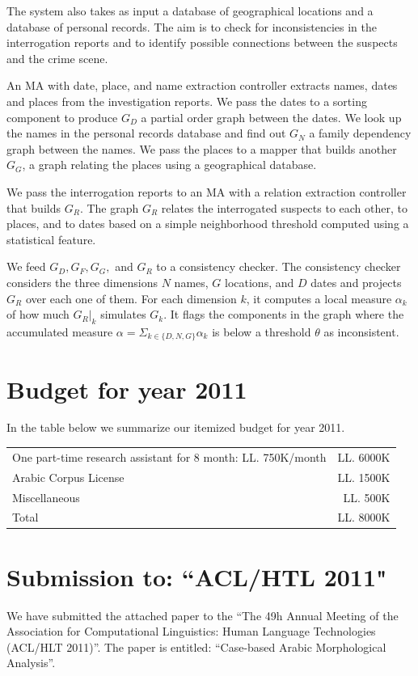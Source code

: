 \documentclass[12pt]{article}
\begin{document}
The system also takes as input a database of geographical
locations and a database of personal records. 
The aim is to check for inconsistencies in the interrogation
reports and to identify possible connections between the suspects
and the crime scene. 

An MA with date, place, and name extraction controller extracts
names, dates and places from the investigation reports. 
We pass the dates to a sorting component to produce $G_D$ 
a partial order graph between the dates. 
We look up the names in the personal records database and find out
$G_N$ a family dependency graph between the names. 
We pass the places to a mapper that builds another $G_G$,
a graph relating the places using a geographical database. 

We pass the interrogation reports to an MA with a relation 
extraction controller that builds $G_R$. 
The graph $G_R$ relates the interrogated suspects
to each other, to places, and to dates based on a simple
neighborhood threshold computed using a statistical feature. 

We feed $G_D, G_F, G_G,$ and $G_R$   
to a consistency checker.
The consistency checker considers the three dimensions 
$N$ names, $G$ locations, and $D$ dates and projects $G_R$
over each one of them.
For each dimension $k$, it computes a local measure 
$\alpha_k$ of how much $G_R|_k$ simulates $G_k$. 
It flags the components in the graph where the accumulated 
measure $\alpha= \Sigma_{k\in\{D,N,G\}} \alpha_k$ is
below a threshold $\theta$ as inconsistent. 

\section{Budget for year 2011}
\label{s:budget}

In the table below we summarize our itemized budget for year 2011. 

\begin{table}[ht]
\begin{tabular}{l r}

 \hline
 One part-time research assistant for 8 month: LL. 750K/month  & LL. 6000K  \\
 Arabic Corpus License & LL. 1500K \\
Miscellaneous  & LL. 500K \\
\hline
 Total  & LL. 8000K \\
 \hline
\end{tabular} 
\end{table}


\section{Submission to: ``ACL/HTL 2011"}
\label{s:paper}

We have submitted the attached paper to the “The 49h Annual Meeting of the Association for Computational Linguistics: Human Language Technologies (ACL/HLT 2011)”. The paper is entitled: “Case-based Arabic Morphological Analysis”.

%
%

%
{\small
  
}
\end{document}
